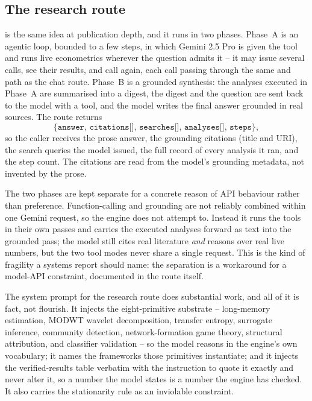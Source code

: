 \subsection{The research route}
\label{sec:research-route}

 is the same idea at publication depth, and it runs in two phases.
Phase~A is an agentic loop, bounded to a few steps, in which Gemini 2.5 Pro is given
the  tool and runs live econometrics wherever the question admits
it -- it may issue several calls, see their results, and call again, each call passing
through the same  and  path as the chat route.
Phase~B is a grounded synthesis: the analyses executed in Phase~A are summarised into a
digest, the digest and the question are sent back to the model with a
 tool, and the model writes the final answer grounded in real
sources. The route returns
\[
  \texttt{\{answer,\ citations[],\ searches[],\ analyses[],\ steps\}},
\]
so the caller receives the prose answer, the grounding citations (title and URI), the
search queries the model issued, the full record of every analysis it ran, and the
step count. The citations are read from the model's grounding metadata, not invented by
the prose.

The two phases are kept separate for a concrete reason of API behaviour rather than
preference. Function-calling and  grounding are not reliably
combined within one Gemini request, so the engine does not attempt to. Instead it runs
the tools in their own passes and carries the executed analyses forward as text into
the grounded pass; the model still cites real literature \emph{and} reasons over real
live numbers, but the two tool modes never share a single request. This is the kind of
fragility a systems report should name: the separation is a workaround for a model-API
constraint, documented in the route itself.

The system prompt for the research route does substantial work, and all of it is fact,
not flourish. It injects the eight-primitive substrate -- long-memory estimation,
MODWT wavelet decomposition, transfer entropy, surrogate inference, community
detection, network-formation game theory, structural attribution, and classifier
validation -- so the model reasons in the engine's own vocabulary; it names the
frameworks those primitives instantiate; and it injects the verified-results table
verbatim with the instruction to quote it exactly and never alter it, so a number the
model states is a number the engine has checked. It also carries the stationarity rule
as an inviolable constraint.

